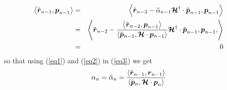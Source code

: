 \begin{eqnarray} \label{eq2}
\left\langle{{\tilde{ \bmi  r}}_{ n-1} ,{\bmi  p}_{n-1}}\right\rangle
&=& \left\langle{
\tilde{\bmi  r}{}_{n-2} -
\tilde{\alpha}{}_{n-1} {\CB H}^{\dagger}\cdot {\tilde{ \bmi  p}}_{ n-1}, 
{{ \bmi  p}}_{ 
n-1} 
}\right\rangle\nonumber\\
&=& \left\langle{
\tilde{\bmi  r}{}_{n-2} -
{\frac{\left\langle{\tilde{\bmi  r}{}_{n-2},{\bmi  
p}_{n-1} }\right\rangle}{\left\langle{\tilde{\bmi  p}{}_{n-1},{\CB H}
\cdot   {\bmi  p}{}_{n-1}}\right\rangle}}
{\CB H}^{\dagger}\cdot {\tilde{ \bmi  p}}_{ n-1},
{{ \bmi  p}}_{ n-1} ,
}\right\rangle\nonumber\\
&=&0
\end{eqnarray}
so that using (\ref{eq1}) and (\ref{eq2}) in (\ref{eq3}) we get
\begin{equation} \label{eq4}
{{ \alpha }}_{n}={\tilde{ \alpha }}_{n}=
{\frac{\left\langle{\tilde{\bmi  r}{}_{n-1},{\bmi  
r}_{n-1}}\right\rangle}{\left\langle{\tilde{\bmi  p}{}_{n},{\CB H}
\cdot   {\bmi  p}_{n}}\right\rangle}}
\end{equation}

